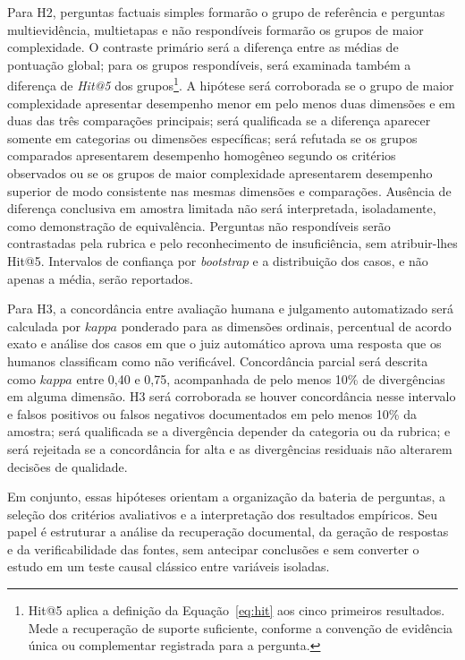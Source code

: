 Para H2, perguntas factuais simples formarão o grupo de referência e perguntas multievidência, multietapas e não respondíveis formarão os grupos de maior complexidade. O contraste primário será a diferença entre as médias de pontuação global; para os grupos respondíveis, será examinada também a diferença de \textit{Hit@5} dos grupos\footnote{Hit@5 aplica a definição da Equação~\ref{eq:hit} aos cinco primeiros resultados. Mede a recuperação de suporte suficiente, conforme a convenção de evidência única ou complementar registrada para a pergunta.}. A hipótese será corroborada se o grupo de maior complexidade apresentar desempenho menor em pelo menos duas dimensões e em duas das três comparações principais; será qualificada se a diferença aparecer somente em categorias ou dimensões específicas; será refutada se os grupos comparados apresentarem desempenho homogêneo segundo os critérios observados ou se os grupos de maior complexidade apresentarem desempenho superior de modo consistente nas mesmas dimensões e comparações. Ausência de diferença conclusiva em amostra limitada não será interpretada, isoladamente, como demonstração de equivalência. Perguntas não respondíveis serão contrastadas pela rubrica e pelo reconhecimento de insuficiência, sem atribuir-lhes Hit@5. Intervalos de confiança por \textit{bootstrap} e a distribuição dos casos, e não apenas a média, serão reportados.

Para H3, a concordância entre avaliação humana e julgamento automatizado será calculada por $kappa$ ponderado para as dimensões ordinais, percentual de acordo exato e análise dos casos em que o juiz automático aprova uma resposta que os humanos classificam como não verificável. Concordância parcial será descrita como $kappa$ entre 0,40 e 0,75, acompanhada de pelo menos 10\% de divergências em alguma dimensão. H3 será corroborada se houver concordância nesse intervalo e falsos positivos ou falsos negativos documentados em pelo menos 10\% da amostra; será qualificada se a divergência depender da categoria ou da rubrica; e será rejeitada se a concordância for alta e as divergências residuais não alterarem decisões de qualidade.

Em conjunto, essas hipóteses orientam a organização da bateria de perguntas, a seleção dos critérios avaliativos e a interpretação dos resultados empíricos. Seu papel é estruturar a análise da recuperação documental, da geração de respostas e da verificabilidade das fontes, sem antecipar conclusões e sem converter o estudo em um teste causal clássico entre variáveis isoladas.

